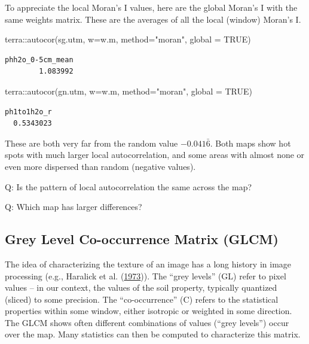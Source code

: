 \documentclass[
  letterpaper,
  DIV=11,
  numbers=noendperiod]{scrartcl}
\newenvironment{Shaded}{\begin{snugshade}}{\end{snugshade}}
\newcommand{\AttributeTok}[1]{\textcolor[rgb]{0.40,0.45,0.13}{#1}}
\newcommand{\ConstantTok}[1]{\textcolor[rgb]{0.56,0.35,0.01}{#1}}
\newcommand{\FunctionTok}[1]{\textcolor[rgb]{0.28,0.35,0.67}{#1}}
\newcommand{\NormalTok}[1]{\textcolor[rgb]{0.00,0.23,0.31}{#1}}
\newcommand{\SpecialCharTok}[1]{\textcolor[rgb]{0.37,0.37,0.37}{#1}}
\newcommand{\StringTok}[1]{\textcolor[rgb]{0.13,0.47,0.30}{#1}}
\begin{document}
To appreciate the local Moran's I values, here are the global Moran's I
with the same weights matrix. These are the averages of all the local
(window) Moran's I.

\begin{Shaded}
\begin{Highlighting}[]
\NormalTok{terra}\SpecialCharTok{::}\FunctionTok{autocor}\NormalTok{(sg.utm, }\AttributeTok{w=}\NormalTok{w.m, }\AttributeTok{method=}\StringTok{"moran"}\NormalTok{, }\AttributeTok{global =} \ConstantTok{TRUE}\NormalTok{)}
\end{Highlighting}
\end{Shaded}

\begin{verbatim}
phh2o_0-5cm_mean 
        1.083992 
\end{verbatim}

\begin{Shaded}
\begin{Highlighting}[]
\NormalTok{terra}\SpecialCharTok{::}\FunctionTok{autocor}\NormalTok{(gn.utm, }\AttributeTok{w=}\NormalTok{w.m, }\AttributeTok{method=}\StringTok{"moran"}\NormalTok{, }\AttributeTok{global =} \ConstantTok{TRUE}\NormalTok{)}
\end{Highlighting}
\end{Shaded}

\begin{verbatim}
ph1to1h2o_r 
  0.5343023 
\end{verbatim}

These are both very far from the random value \(-0.041\bar{6}\). Both
maps show hot spots with much larger local autocorrelation, and some
areas with almost none or even more dispersed than random (negative
values).

Q: Is the pattern of local autocorrelation the same across the map?

Q: Which map has larger differences?

\hypertarget{sec-glcm}{%
\subsection{Grey Level Co-occurrence Matrix (GLCM)}\label{sec-glcm}}

The idea of characterizing the texture of an image has a long history in
image processing (e.g., Haralick et al.
(\protect\hyperlink{ref-haralickTexturalFeaturesImage1973}{1973})). The
``grey levels'' (GL) refer to pixel values -- in our context, the values
of the soil property, typically quantized (sliced) to some precision.
The ``co-occurrence'' (C) refers to the statistical properties within
some window, either isotropic or weighted in some direction. The GLCM
shows often different combinations of values (``grey levels'') occur
over the map. Many statistics can then be computed to characterize this
matrix.
\end{document}
